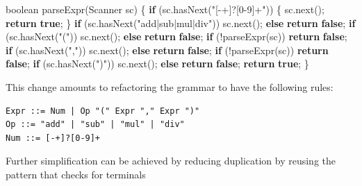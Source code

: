 \documentclass[
]{book}
\newenvironment{Shaded}{\begin{snugshade}}{\end{snugshade}}
\newcommand{\BuiltInTok}[1]{#1}
\newcommand{\DataTypeTok}[1]{\textcolor[rgb]{0.13,0.29,0.53}{#1}}
\newcommand{\FunctionTok}[1]{\textcolor[rgb]{0.00,0.00,0.00}{#1}}
\newcommand{\KeywordTok}[1]{\textcolor[rgb]{0.13,0.29,0.53}{\textbf{#1}}}
\newcommand{\NormalTok}[1]{#1}
\newcommand{\StringTok}[1]{\textcolor[rgb]{0.31,0.60,0.02}{#1}}
\begin{document}
\begin{Shaded}
\begin{Highlighting}[]
\DataTypeTok{boolean} \FunctionTok{parseExpr}\NormalTok{(}\BuiltInTok{Scanner}\NormalTok{ sc) \{}
 \KeywordTok{if}\NormalTok{ (sc.}\FunctionTok{hasNext}\NormalTok{(}\StringTok{"[{-}+]?[0{-}9]+"}\NormalTok{)) \{}
\NormalTok{    sc.}\FunctionTok{next}\NormalTok{();}
    \KeywordTok{return} \KeywordTok{true}\NormalTok{;}
\NormalTok{  \}}
 \KeywordTok{if}\NormalTok{ (sc.}\FunctionTok{hasNext}\NormalTok{(}\StringTok{"add|sub|mul|div"}\NormalTok{))}
\NormalTok{   sc.}\FunctionTok{next}\NormalTok{();}
 \KeywordTok{else}
   \KeywordTok{return} \KeywordTok{false}\NormalTok{;}
 \KeywordTok{if}\NormalTok{ (sc.}\FunctionTok{hasNext}\NormalTok{(}\StringTok{"("}\NormalTok{))}
\NormalTok{    sc.}\FunctionTok{next}\NormalTok{();}
 \KeywordTok{else}
   \KeywordTok{return} \KeywordTok{false}\NormalTok{;}
 \KeywordTok{if}\NormalTok{ (!}\FunctionTok{parseExpr}\NormalTok{(sc))}
   \KeywordTok{return} \KeywordTok{false}\NormalTok{;}
 \KeywordTok{if}\NormalTok{ (sc.}\FunctionTok{hasNext}\NormalTok{(}\StringTok{","}\NormalTok{))}
\NormalTok{   sc.}\FunctionTok{next}\NormalTok{();}
 \KeywordTok{else}
   \KeywordTok{return} \KeywordTok{false}\NormalTok{;}
 \KeywordTok{if}\NormalTok{ (!}\FunctionTok{parseExpr}\NormalTok{(sc))}
   \KeywordTok{return} \KeywordTok{false}\NormalTok{;}
 \KeywordTok{if}\NormalTok{ (sc.}\FunctionTok{hasNext}\NormalTok{(}\StringTok{")"}\NormalTok{))}
\NormalTok{   sc.}\FunctionTok{next}\NormalTok{();}
 \KeywordTok{else}
   \KeywordTok{return} \KeywordTok{false}\NormalTok{;}
 \KeywordTok{return} \KeywordTok{true}\NormalTok{;}
\NormalTok{\}}
\end{Highlighting}
\end{Shaded}

This change amounts to refactoring the grammar to have the following rules:

\begin{verbatim}
Expr ::= Num | Op "(" Expr "," Expr ")"
Op ::= "add" | "sub" | "mul" | "div"
Num ::= [-+]?[0-9]+
\end{verbatim}

Further simplification can be achieved by reducing duplication by reusing the pattern that checks for terminals
\end{document}
